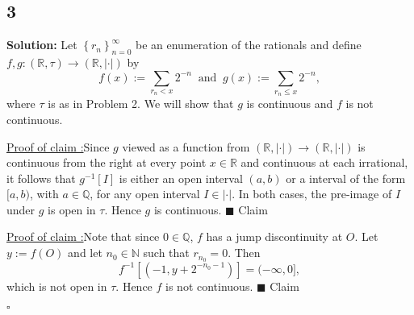 \documentclass[12pt]{article}
\newcounter{ProofCounter}
\newcounter{ClaimCounter}[ProofCounter]
\newenvironment{Solution}{\stepcounter{ProofCounter}\textbf{Solution:}}{\hfill$\square$}
\newenvironment{claim}[1]{\vspace{1mm}\stepcounter{ClaimCounter}\par\noindent\underline{\bf Claim \theClaimCounter:}\space#1}{}
\newenvironment{claimproof}[1]{\par\noindent\underline{Proof of claim \theClaimCounter:}\space#1}{\hfill $\blacksquare$ Claim \theClaimCounter}
\begin{document}
\subsection*{3}
\begin{Solution}
  Let $\left\{ r_n \right\}_{n=0}^{\infty}$ be an enumeration of the rationals and define $f, g: (\mathbb{R}, \tau) \rightarrow (\mathbb{R}, |\cdot|)$
  by
  \[
    f(x) := \sum_{r_n < x}2^{-n} \ \text{ and } \ g(x) := \sum_{r_n \leq x}2^{-n},
  \]
  where $\tau$ is as in Problem 2. We will show that $g$ is continuous and $f$ is not continuous. 

  \begin{claimproof}
    Since $g$ viewed as a function from $(\mathbb{R}, |\cdot|) \rightarrow (\mathbb{R}, |\cdot|)$ is continuous from the right at every point $x \in
    \mathbb{R}$ and continuous at each irrational, it follows that $g^{-1}[I]$ is either an open interval $(a,b)$ or a interval of the form $[a,b)$,
    with $a \in \mathbb{Q}$, for any open interval $I \in |\cdot|$. In both cases, the pre-image of $I$ under $g$ is open in $\tau$.
    Hence $g$ is continuous.
  \end{claimproof}

  \begin{claimproof}
    Note that since $0 \in \mathbb{Q}$, $f$ has a jump discontinuity at $O$. Let $y := f(O)$ and let $n_0 \in \mathbb{N}$ such that $r_{n_0} = 0$.
    Then 
    \[
      f^{-1}[(-1, y + 2^{-n_0-1})] = (-\infty, 0],
    \]
    which is not open in $\tau$. Hence $f$ is not continuous.
  \end{claimproof}

\end{Solution}
\end{document}
